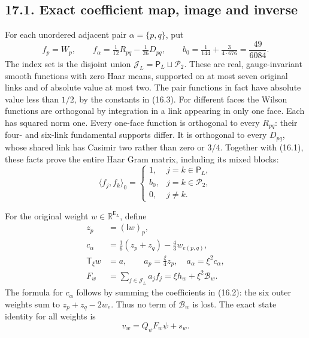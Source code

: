 \documentclass[
]{article}
\begin{document}
\subsection{17.1. Exact coefficient map, image and
inverse}\label{exact-coefficient-map-image-and-inverse}

For each unordered adjacent pair \(\alpha=\{p,q\}\), put \[
f_p=W_p,\qquad
f_\alpha=\tfrac1{12}R_{pq}-\tfrac1{26}D_{pq},\qquad
b_0=\tfrac1{144}+\tfrac3{4\cdot676}=\frac{49}{6084}.
\] The index set is the disjoint union
\(\mathscr J_L=\mathsf P_L\sqcup\mathscr P_2\). These are real,
gauge-invariant smooth functions with zero Haar means, supported on at
most seven original links and of absolute value at most two. The pair
functions in fact have absolute value less than \(1/2\), by the
constants in (16.3). For different faces the Wilson functions are
orthogonal by integration in a link appearing in only one face. Each has
squared norm one. Every one-face function is orthogonal to every
\(R_{pq}\): their four- and six-link fundamental supports differ. It is
orthogonal to every \(D_{pq}\), whose shared link has Casimir two rather
than zero or \(3/4\). Together with (16.1), these facts prove the entire
Haar Gram matrix, including its mixed blocks: \[
\langle f_j,f_k\rangle_0=
\begin{cases}
1,&j=k\in\mathsf P_L,\\
b_0,&j=k\in\mathscr P_2,\\
0,&j\ne k.
\end{cases}                                                   \tag{17.1}
\]

For the original weight \(w\in\mathbb R^{\mathsf E_L}\), define \[
\begin{split}
z_p&=(\mathsf Iw)_p,\\
c_\alpha&=\tfrac16(z_p+z_q)-\tfrac43w_{e(p,q)},\\
\mathsf T_\xi w&=a,\qquad
a_p=\tfrac{\xi}{4}z_p,\quad a_\alpha=\xi^2c_\alpha,\\
F_w&=\sum_{j\in\mathscr J_L}a_j f_j
     =\xi h_w+\xi^2\mathcal B_w .
\end{split}                                                   \tag{17.2}
\] The formula for \(c_\alpha\) follows by summing the coefficients in
(16.2): the six outer weights sum to \(z_p+z_q-2w_e\). Thus no term of
\(\mathcal B_w\) is lost. The exact state identity for all weights is \[
v_w=Q_\psi F_w\psi+s_w .                                     \tag{17.3}
\]
\end{document}
